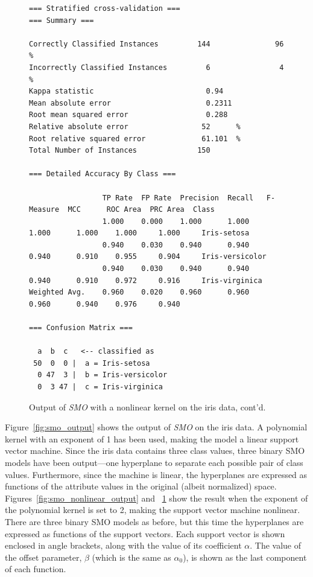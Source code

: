 \begin{figure}[!th]
\begin{mdframed}[innermargin=-1.0cm]
\begin{Verbatim}[fontsize=\tiny]
=== Stratified cross-validation ===
=== Summary ===

Correctly Classified Instances         144               96      %
Incorrectly Classified Instances         6                4      %
Kappa statistic                          0.94  
Mean absolute error                      0.2311
Root mean squared error                  0.288 
Relative absolute error                 52      %
Root relative squared error             61.101  %
Total Number of Instances              150     

=== Detailed Accuracy By Class ===

                 TP Rate  FP Rate  Precision  Recall   F-Measure  MCC      ROC Area  PRC Area  Class
                 1.000    0.000    1.000      1.000    1.000      1.000    1.000     1.000     Iris-setosa
                 0.940    0.030    0.940      0.940    0.940      0.910    0.955     0.904     Iris-versicolor
                 0.940    0.030    0.940      0.940    0.940      0.910    0.972     0.916     Iris-virginica
Weighted Avg.    0.960    0.020    0.960      0.960    0.960      0.940    0.976     0.940     

=== Confusion Matrix ===

  a  b  c   <-- classified as
 50  0  0 |  a = Iris-setosa
  0 47  3 |  b = Iris-versicolor
  0  3 47 |  c = Iris-virginica
\end{Verbatim}
\end{mdframed}
\caption{\label{fig:smo_nonlinear_cont} Output of \textit{SMO} with a nonlinear kernel on the iris data, cont'd.}
\end{figure}

Figure~\ref{fig:smo_output} shows the output of \textit{SMO} on the
iris data. A polynomial kernel with an exponent of 1 has been used,
making the model a linear support vector machine. Since the iris data
contains three class values, three binary SMO models have been
output---one hyperplane to separate each possible pair of class
values. Furthermore, since the machine is linear, the hyperplanes are
expressed as functions of the attribute values in the original (albeit
normalized) space. Figures~\ref{fig:smo_nonlinear_output} and
~\ref{fig:smo_nonlinear_cont} show the result when the exponent of the
polynomial kernel is set to 2, making the support vector machine
nonlinear. There are three binary SMO models as before, but this time
the hyperplanes are expressed as functions of the support
vectors. Each support vector is shown enclosed in angle brackets,
along with the value of its coefficient $\alpha$. The value of the
offset parameter, $\beta$ (which is the same as $\alpha_0$), is shown
as the last component of each function.


